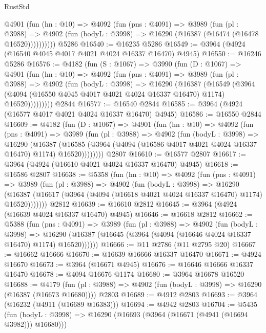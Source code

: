 \begin{lexlean}{RustStd}
\begin{coremodule}
        @4901
          (fun (hn : @10) =>
          @4092
            (fun (pns : @4091) =>
            @3989
              (fun (pl : @3988) =>
              @4902 (fun (bodyL : @3998) => @16290 (@16387 (@16474 (@16478 @16520))))))))))
    @5286
@16540 := @16235 @5286
@16549 := @3964 (@4924 (@16540 @4045 @4017 @4021 @4024 @16337 @16470) @4945)
@16550 := @16246 @5286
@16576 := @4182
    (fun (S : @1067) =>
    @3990
      (fun (D : @1067) =>
      @4901
        (fun (hn : @10) =>
        @4092
          (fun (pns : @4091) =>
          @3989
            (fun (pl : @3988) =>
            @4902
              (fun (bodyL : @3998) =>
              @16290
                (@16387
                  (@16549
                    (@3964
                      (@4094 (@16550 @4045 @4017 @4021 @4024 @16337 @16470) @1174)
                      @16520)))))))))
    @2844
@16577 := @16540 @2844
@16585 := @3964 (@4924 (@16577 @4017 @4021 @4024 @16337 @16470) @4945)
@16586 := @16550 @2844
@16609 := @4182
    (fun (D : @1067) =>
    @4901
      (fun (hn : @10) =>
      @4092
        (fun (pns : @4091) =>
        @3989
          (fun (pl : @3988) =>
          @4902
            (fun (bodyL : @3998) =>
            @16290
              (@16387
                (@16585 (@3964 (@4094 (@16586 @4017 @4021 @4024 @16337 @16470) @1174) @16520))))))))
    @2807
@16610 := @16577 @2807
@16617 := @3964 (@4924 (@16610 @4021 @4024 @16337 @16470) @4945)
@16618 := @16586 @2807
@16638 := @5358
    (fun (hn : @10) =>
    @4092
      (fun (pns : @4091) =>
      @3989
        (fun (pl : @3988) =>
        @4902
          (fun (bodyL : @3998) =>
          @16290
            (@16387 (@16617 (@3964 (@4094 (@16618 @4021 @4024 @16337 @16470) @1174) @16520)))))))
    @2812
@16639 := @16610 @2812
@16645 := @3964 (@4924 (@16639 @4024 @16337 @16470) @4945)
@16646 := @16618 @2812
@16662 := @5388
    (fun (pns : @4091) =>
    @3989
      (fun (pl : @3988) =>
      @4902
        (fun (bodyL : @3998) =>
        @16290 (@16387 (@16645 (@3964 (@4094 (@16646 @4024 @16337 @16470) @1174) @16520))))))
@16666 := @11 @2786 (@11 @2795 @20)
@16667 := @16662 @16666
@16670 := @16639 @16666 @16337 @16470
@16671 := @4924 @16670
@16673 := @3964 (@16671 @4945)
@16676 := @16646 @16666 @16337 @16470
@16678 := @4094 @16676 @1174
@16680 := @3964 @16678 @16520
@16688 := @4179
    (fun (pl : @3988) => @4902 (fun (bodyL : @3998) => @16290 (@16387 (@16673 @16680))))
    @2803
@16689 := @4912 @2803
@16693 := @3964 (@16232 (@4911 (@16689 @16383)))
@16694 := @4942 @2803
@16704 := @5435
    (fun (bodyL : @3998) => @16290 (@16693 (@3964 (@16671 (@4941 (@16694 @3982))) @16680)))

\end{coremodule}
\end{lexlean}
